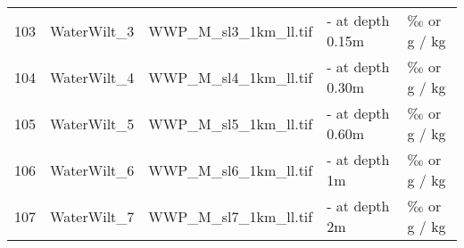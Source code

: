 \begin{table}[ht]
\begin{tabular}{rllll}
  103 & WaterWilt\_3 & WWP\_M\_sl3\_1km\_ll.tif & - at depth 0.15m & ‰ or g / kg \\ 
  104 & WaterWilt\_4 & WWP\_M\_sl4\_1km\_ll.tif & - at depth 0.30m & ‰ or g / kg \\ 
  105 & WaterWilt\_5 & WWP\_M\_sl5\_1km\_ll.tif & - at depth 0.60m & ‰ or g / kg \\ 
  106 & WaterWilt\_6 & WWP\_M\_sl6\_1km\_ll.tif & - at depth 1m & ‰ or g / kg \\ 
  107 & WaterWilt\_7 & WWP\_M\_sl7\_1km\_ll.tif & - at depth 2m & ‰ or g / kg \\ 
   \hline
\end{tabular}
\end{table}
